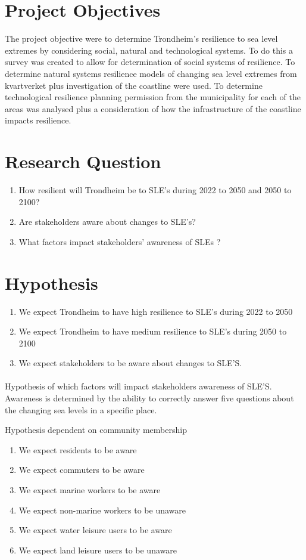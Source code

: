 \section{Project Objectives}
The project objective were to determine Trondheim's resilience to sea level extremes by considering social, natural and technological systems. To do this a survey was created to allow for determination of social systems of resilience. To determine natural systems resilience models of changing sea level extremes from kvartverket plus investigation of the coastline were used. To determine technological resilience planning permission from the municipality for each of the areas was analysed plus a consideration of how the infrastructure of the coastline impacts resilience.

\section{Research Question}
\begin{enumerate}
    \item How resilient will Trondheim be to SLE’s during 2022 to 2050 and 2050 to 2100?
    \item Are stakeholders aware about changes to SLE’s?
    \item What factors impact stakeholders’ awareness of SLEs ?
\end{enumerate}

\section{Hypothesis}
\begin{enumerate}
    \item We expect Trondheim to have high resilience to SLE's during 2022 to 2050
    \item We expect Trondheim to have medium resilience to SLE's during 2050 to 2100
    \item We expect stakeholders to be aware about changes to SLE'S.
\end{enumerate}
\paragraph{}
Hypothesis of which factors will impact stakeholders awareness of SLE'S.
Awareness is determined by the ability to correctly answer five questions about the changing sea levels in a specific place.

Hypothesis dependent on community membership
\begin{enumerate}
    \item We expect residents to be aware
    \item We expect commuters to be aware
    \item We expect marine workers to be aware
    \item We expect non-marine workers to be unaware
    \item We expect water leisure users to be aware
    \item We expect land leisure users to be unaware

    \end{enumerate}
